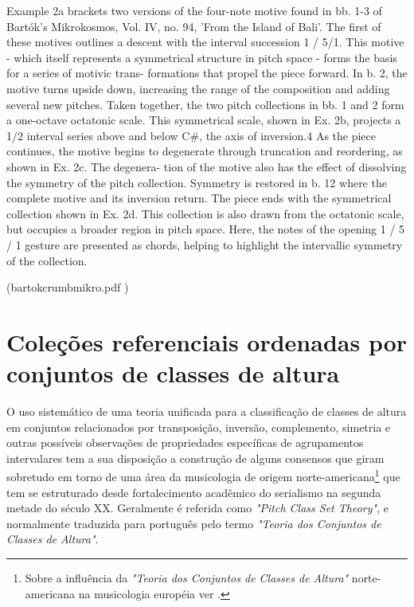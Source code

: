 \documentclass[
	12pt,				%
	openright,			%
	twoside,			%
	a4paper,			%
	english,			%
	french,				%
	spanish,			%
	brazil				%
	]{abntex2}
\begin{document}
Example 2a brackets two versions of the four-note motive found in
bb. 1-3 of Bartók's Mikrokosmos, Vol. IV, no. 94, 'From the Island of
Bali'. The first of these motives outlines a descent with the interval
succession 1 / 5/1. This motive - which itself represents a symmetrical
structure in pitch space - forms the basis for a series of motivic trans-
formations that propel the piece forward. In b. 2, the motive turns
upside down, increasing the range of the composition and adding
several new pitches. Taken together, the two pitch collections in bb. 1
and 2 form a one-octave octatonic scale. This symmetrical scale, shown
in Ex. 2b, projects a 1/2 interval series above and below C\#, the axis of
inversion.4 As the piece continues, the motive begins to degenerate
through truncation and reordering, as shown in Ex. 2c. The degenera-
tion of the motive also has the effect of dissolving the symmetry of the
pitch collection. Symmetry is restored in b. 12 where the complete
motive and its inversion return. The piece ends with the symmetrical
collection shown in Ex. 2d. This collection is also drawn from the
octatonic scale, but occupies a broader region in pitch space. Here, the
notes of the opening 1 / 5 / 1 gesture are presented as chords, helping to
highlight the intervallic symmetry of the collection.

(bartokcrumbmikro.pdf )


\section{Coleções referenciais ordenadas por conjuntos de classes de altura}

O uso sistemático de uma teoria unificada para a classificação de classes de altura em conjuntos relacionados por transposição, inversão, complemento, simetria e outras possíveis observações de propriedades específicas de agrupamentos intervalares tem a sua disposição a construção de alguns consensos que giram sobretudo em torno de uma área da musicologia de origem norte-americana\footnote{Sobre a influência da \textit{"Teoria dos Conjuntos de Classes de Altura"} norte-americana na musicologia européia ver .} que tem se estruturado desde fortalecimento acadêmico do serialismo na segunda metade do século XX. Geralmente é referida como \textit{"Pitch Class Set Theory"}, e normalmente traduzida para português pelo termo \textit{"Teoria dos Conjuntos de Classes de Altura"}\cite{straus2004}.
\end{document}
